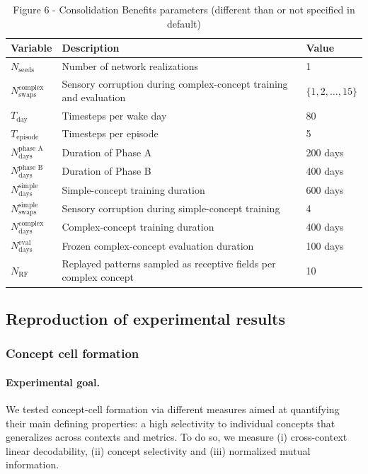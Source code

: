 \documentclass{article}
\begin{document}
\begin{table}[h!]
\centering
\caption{Figure 6 - Consolidation Benefits parameters (different than or not specified in default)}
\label{tab:figure_6B}
\begin{tabular}{lll}
\toprule
\textbf{Variable} & \textbf{Description} & \textbf{Value} \\
\midrule
$N_{\textrm{seeds}}$ & Number of network realizations & 1 \\
$N_{\textrm{swaps}}^{\textrm{complex}}$ & Sensory corruption during complex-concept training and evaluation & $\{1,2,\ldots,15\}$ \\
$T_{\textrm{day}}$ & Timesteps per wake day & 80 \\
$T_{\textrm{episode}}$ & Timesteps per episode & 5 \\
$N_{\textrm{days}}^{\textrm{phase A}}$ & Duration of Phase A & 200 days \\
$N_{\textrm{days}}^{\textrm{phase B}}$ & Duration of Phase B & 400 days \\
\midrule
$N_{\textrm{days}}^{\textrm{simple}}$ & Simple-concept training duration & 600 days \\
$N_{\textrm{swaps}}^{\textrm{simple}}$ & Sensory corruption during simple-concept training & 4 \\
$N_{\textrm{days}}^{\textrm{complex}}$ & Complex-concept training duration & 400 days \\
$N_{\textrm{days}}^{\textrm{eval}}$ & Frozen complex-concept evaluation duration & 100 days \\
$N_{\textrm{RF}}$ & Replayed patterns sampled as receptive fields per complex concept & 10 \\
\bottomrule
\end{tabular}
\end{table}
\subsection*{Reproduction of experimental results}
\subsubsection*{Concept cell formation }
\paragraph{Experimental goal.}
We tested concept-cell formation via different measures aimed at quantifying their main defining properties: a high selectivity to individual concepts that generalizes across contexts and metrics. To do so, we measure (i) cross-context linear decodability, (ii) concept selectivity and (iii) normalized mutual information.
\end{document}
